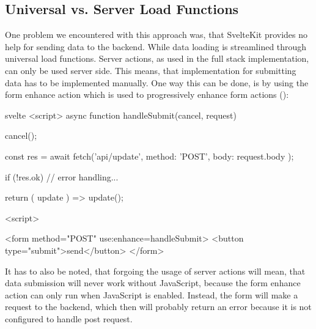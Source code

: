 
\subsection{Universal vs. Server Load Functions}

One problem we encountered with this approach was, that SvelteKit provides no help for sending data to the backend. While data loading is streamlined through universal load functions. Server actions, as used in the full stack implementation, can only be used server side. This means, that implementation for submitting data has to be implemented manually. One way this can be done, is by using the form enhance action which is used to progressively enhance form actions ():

\begin{myminted}{svelte}{}
<script>
  async function handleSubmit({cancel, request}) {
    cancel();

    const res = await fetch('api/update', {
        method: 'POST',
        body: request.body
    });

    if (!res.ok) {
      // error handling...
    }

    return ({ update }) => {
      update();
    }
  }
<script>

<form method="POST" use:enhance={handleSubmit}>
  <button type="submit">send</button>
</form>
\end{myminted}

It has to also be noted, that forgoing the usage of server actions will mean, that data submission will never work without JavaScript, because the form enhance action can only run when JavaScript is enabled. Instead, the form will make a request to the backend, which then will probably return an error because it is not configured to handle post request.

